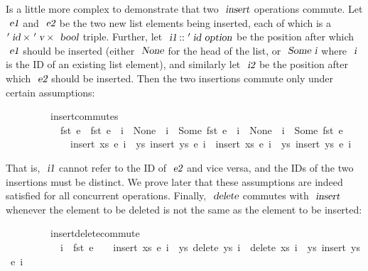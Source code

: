 Is a little more complex to demonstrate that two $\isa{insert}$ operations commute.
Let $\isa{e1}$ and $\isa{e2}$ be the two new list elements being inserted, each of which is a $\isacharprime\isa{id} \mathbin{\isasymtimes} \isacharprime\isa{v} \mathbin{\isasymtimes} \isa{bool}$ triple.
Further, let $\isa{i1} \mathbin{\isacharcolon\isacharcolon} \isacharprime\isa{id option}$ be the position after which $\isa{e1}$ should be inserted (either $\isa{None}$ for the head of the list, or $\isa{Some i}$ where $\isa{i}$ is the ID of an existing list element), and similarly let $\isa{i2}$ be the position after which $\isa{e2}$ should be inserted.
Then the two insertions commute only under certain assumptions:
\vspace{0.35em}
\begin{isabellebody}
\ \ \ \ \ \ \ \ \ insert{\isacharunderscore}commutes{\isacharcolon}\isanewline
\ \ \ \ \ \ \ \ \ \ \ {\isachardoublequoteopen}fst\ e{}\ {\isasymnoteq}\ fst\ e{}{\isachardoublequoteclose}\ \ {\isachardoublequoteopen}i{}\ {\isacharequal}\ None\ {\isasymor}\ i{}\ {\isasymnoteq}\ Some\ {\isacharparenleft}fst\ e{}{\isacharparenright}{\isachardoublequoteclose}\ \ {\isachardoublequoteopen}i{}\ {\isacharequal}\ None\ {\isasymor}\ i{}\ {\isasymnoteq}\ Some\ {\isacharparenleft}fst\ e{}{\isacharparenright}{\isachardoublequoteclose}\isanewline
\ \ \ \ \ \ \ \ \ \ \ \ \ {\isachardoublequoteopen}insert\ xs\ e{}\ i{}\ {\isasymbind}\ {\isacharparenleft}{\isasymlambda}ys{\isachardot}\ insert\ ys\ e{}\ i{}{\isacharparenright}\ {\isacharequal}\ insert\ xs\ e{}\ i{}\ {\isasymbind}\ {\isacharparenleft}{\isasymlambda}ys{\isachardot}\ insert\ ys\ e{}\ i{}{\isacharparenright}{\isachardoublequoteclose}
\end{isabellebody}
\vspace{0.35em}
\noindent
That is, $\isa{i1}$ cannot refer to the ID of $\isa{e2}$ and vice versa, and the IDs of the two insertions must be distinct.
We prove later that these assumptions are indeed satisfied for all concurrent operations.
Finally, $\isa{delete}$ commutes with $\isa{insert}$ whenever the element to be deleted is not the same as the element to be inserted:
\vspace{0.35em}
\begin{isabellebody}
\ \ \ \ \ \ \ \ \ insert{\isacharunderscore}delete{\isacharunderscore}commute{\isacharcolon}\isanewline
\ \ \ \ \ \ \ \ \ \ \ {\isachardoublequoteopen}i{}\ {\isasymnoteq}\ fst\ e{\isachardoublequoteclose}\ \ \ \ {\isachardoublequoteopen}insert\ xs\ e\ i{}\ {\isasymbind}\ {\isacharparenleft}{\isasymlambda}ys{\isachardot}\ delete\ ys\ i{}{\isacharparenright}\ {\isacharequal}\ delete\ xs\ i{}\ {\isasymbind}\ {\isacharparenleft}{\isasymlambda}ys{\isachardot}\ insert\ ys\ e\ i{}{\isacharparenright}{\isachardoublequoteclose}
\end{isabellebody}

